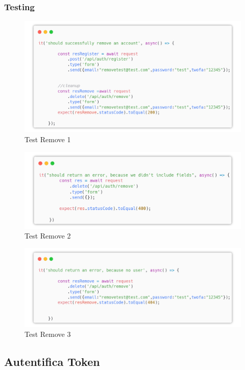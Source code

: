 \documentclass{report}
\begin{document}
\subsubsection*{Testing}
\begin{figure}[H]
	\centering\includegraphics[width=1\textwidth]{images/microservizio-autenticazione/tests/remove_test_1.png}
	\caption{Test Remove 1}
\end{figure}
\begin{figure}[H]
	\centering\includegraphics[width=1\textwidth]{images/microservizio-autenticazione/tests/remove_test_2.png}
	\caption{Test Remove 2}
\end{figure}
\begin{figure}[H]
	\centering\includegraphics[width=1\textwidth]{images/microservizio-autenticazione/tests/remove_test_3.png}
	\caption{Test Remove 3}
\end{figure}
\subsection{Autentifica Token}
\end{document}

